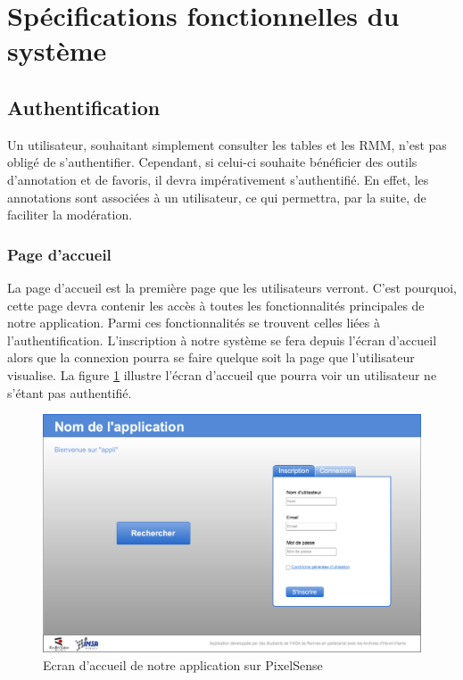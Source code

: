 \documentclass[a4paper]{article}
\begin{document}
\section{Spécifications fonctionnelles du système}

\subsection{Authentification}

Un utilisateur, souhaitant simplement consulter les tables et les RMM, n'est pas obligé de s'authentifier. Cependant, si celui-ci souhaite bénéficier des outils d'annotation et de favoris, il devra impérativement s'authentifié. En effet, les annotations sont associées à un utilisateur, ce qui permettra, par la suite, de faciliter la modération.

\subsubsection{Page d'accueil} 

La page d'accueil est la première page que les utilisateurs verront. C'est pourquoi, cette page devra contenir les accès à toutes les fonctionnalités principales de notre application. Parmi ces fonctionnalités se trouvent celles liées à l'authentification. L'inscription à notre système se fera depuis l'écran d'accueil alors que la connexion pourra se faire quelque soit la page que l'utilisateur visualise. La figure \ref{fig:accueil} illustre l'écran d'accueil que pourra voir un utilisateur ne s'étant pas authentifié.

\begin{figure}[H]
\centering
\includegraphics[width=\textwidth]{accueil.png}
\caption{Ecran d'accueil de notre application sur PixelSense}
\label{fig:accueil}
\end{figure}
\end{document}
